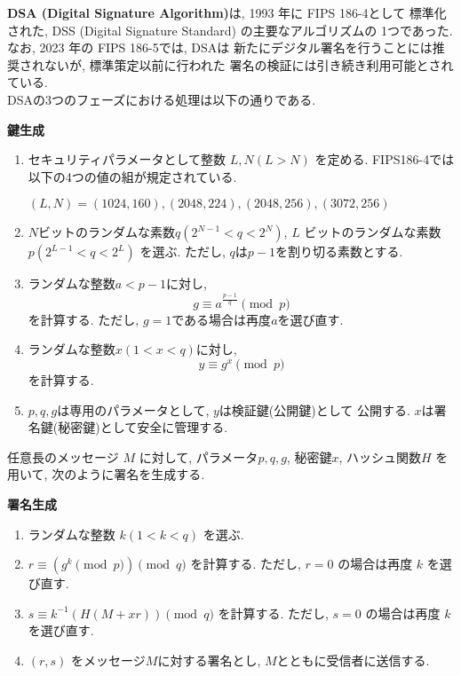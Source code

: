 \indent \textbf{DSA (Digital Signature Algorithm)}は, 1993 年に FIPS 186-4として
標準化された, DSS (Digital Signature Standard) の主要なアルゴリズムの
1つであった. なお, 2023 年の FIPS 186-5\cite{fips186-5}では, DSAは
新たにデジタル署名を行うことには推奨されないが, 標準策定以前に行われた
署名の検証には引き続き利用可能とされている.\\
\indent DSAの3つのフェーズにおける処理は以下の通りである.\\
\let\ltxlist\list
\begin{breakitembox}[l]{\textbf{鍵生成}}
  　
  \begin{enumerate}[parsep=7pt]
    \item セキュリティパラメータとして整数 $L,N (L>N)$ を定める. 
    FIPS186-4では以下の4つの値の組が規定されている.
    \begin{center}
      $(L,N) = (1024,160), (2048,224), (2048,256), (3072,256)$
    \end{center}
    \item $N$ビットのランダムな素数$q(2^{N-1}<q<2^{N})$, 
    $L$ ビットのランダムな素数$p(2^{L-1}<q<2^{L})$ を選ぶ.
    ただし, $q$は$p-1$を割り切る素数とする.
    \item ランダムな整数$a<p-1$に対し,
    \[
      g\equiv a^{\frac{p-1}{q}}\pmod p
    \] 
    を計算する. ただし, $g=1$である場合は再度$a$を選び直す.
    \item ランダムな整数$x(1<x<q)$に対し,
    \[
      y\equiv g^x\pmod p
    \]
    を計算する.
    \item $p,q,g$は専用のパラメータとして, $y$は検証鍵(公開鍵)として
    公開する. $x$は署名鍵(秘密鍵)として安全に管理する.
  \end{enumerate}
\end{breakitembox}
\vspace{1em}
\indent 任意長のメッセージ $M$ に対して, パラメータ$p, q, g$, 秘密鍵$x$, 
ハッシュ関数$H$ を用いて, 次のように署名を生成する.
\vspace{1em}
\let\ltxlist\list
\begin{breakitembox}[l]{\textbf{署名生成}}
  　
  \begin{enumerate}[parsep=7pt]
    \item ランダムな整数 $k(1<k<q)$ を選ぶ.
    \item $r\equiv (g^k\pmod p)\pmod q$ を計算する. 
    ただし, $r=0$ の場合は再度 $k$ を選び直す.
    \item $s\equiv k^{-1}(H(M+xr))\pmod q$ を計算する.
    ただし, $s=0$ の場合は再度 $k$ を選び直す.
    \item $(r,s)$ をメッセージ$M$に対する署名とし, 
    $M$とともに受信者に送信する.
  \end{enumerate}
\end{breakitembox}
